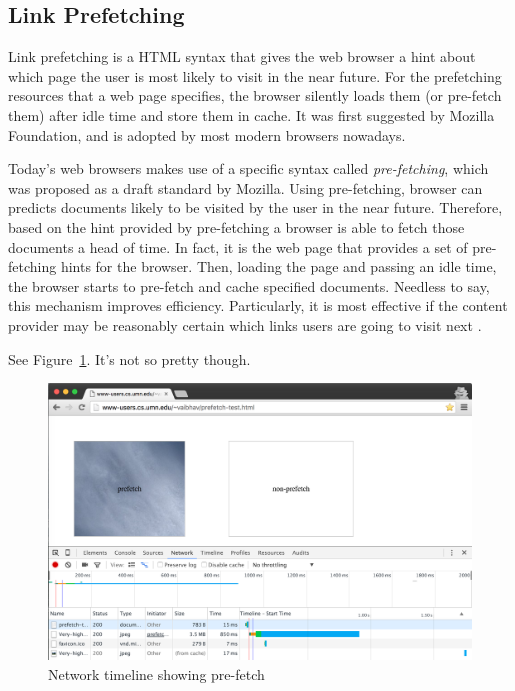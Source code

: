 
\subsection{Link Prefetching}

Link prefetching is a HTML syntax that gives the web browser a hint about which page the user is most likely to visit in the near future.
For the prefetching resources that a web page specifies, the browser silently loads them (or pre-fetch them) after idle time and store them in cache. 
It was first suggested by Mozilla Foundation, and is adopted by most modern browsers nowadays.

Today's web browsers makes use of a specific syntax called \emph{pre-fetching}, which was proposed as a draft standard by Mozilla.
Using pre-fetching, browser can predicts documents likely to be visited by the user in the near future.
Therefore, based on the hint provided by pre-fetching a browser is able to fetch those documents a head of time.
In fact, it is the web page that provides a set of pre-fetching hints for the browser.
Then, loading the page and passing an idle time, the browser starts to pre-fetch and cache specified documents.
Needless to say, this mechanism improves efficiency.
Particularly, it is most effective if the content provider may be reasonably certain which links users are going to visit next \cite{wikiPreF}.


See Figure~\ref{fig:network}. It's not so pretty though.
\begin{figure}[h]
\includegraphics[width=\columnwidth]{figures/prefetch-network.png}
\centering
\caption{Network timeline showing pre-fetch}
\label{fig:network}
\end{figure}


